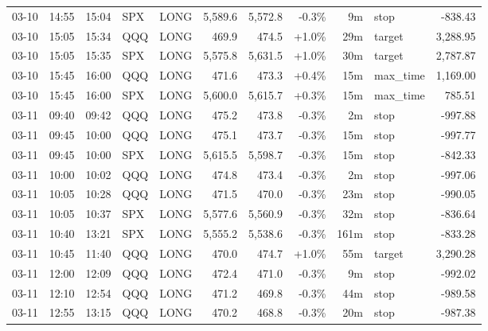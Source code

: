 \documentclass[11pt,a4paper,twoside]{article}
\begin{document}
\begin{center}
\begin{longtable}{>{\color{txtmain}}l l l l l r r r r >{\color{txtmain}}l r}
03-10 & 14:55 & 15:04 & SPX & LONG & 5,589.6 & 5,572.8 & \textcolor{lossred}{-0.3\%} & 9m & stop & \textcolor{lossred}{-838.43} \\
03-10 & 15:05 & 15:34 & QQQ & LONG & 469.9 & 474.5 & \textcolor{wingreen}{+1.0\%} & 29m & target & \textcolor{wingreen}{3,288.95} \\
03-10 & 15:05 & 15:35 & SPX & LONG & 5,575.8 & 5,631.5 & \textcolor{wingreen}{+1.0\%} & 30m & target & \textcolor{wingreen}{2,787.87} \\
03-10 & 15:45 & 16:00 & QQQ & LONG & 471.6 & 473.3 & \textcolor{wingreen}{+0.4\%} & 15m & max\_time & \textcolor{wingreen}{1,169.00} \\
03-10 & 15:45 & 16:00 & SPX & LONG & 5,600.0 & 5,615.7 & \textcolor{wingreen}{+0.3\%} & 15m & max\_time & \textcolor{wingreen}{785.51} \\
03-11 & 09:40 & 09:42 & QQQ & LONG & 475.2 & 473.8 & \textcolor{lossred}{-0.3\%} & 2m & stop & \textcolor{lossred}{-997.88} \\
03-11 & 09:45 & 10:00 & QQQ & LONG & 475.1 & 473.7 & \textcolor{lossred}{-0.3\%} & 15m & stop & \textcolor{lossred}{-997.77} \\
03-11 & 09:45 & 10:00 & SPX & LONG & 5,615.5 & 5,598.7 & \textcolor{lossred}{-0.3\%} & 15m & stop & \textcolor{lossred}{-842.33} \\
03-11 & 10:00 & 10:02 & QQQ & LONG & 474.8 & 473.4 & \textcolor{lossred}{-0.3\%} & 2m & stop & \textcolor{lossred}{-997.06} \\
03-11 & 10:05 & 10:28 & QQQ & LONG & 471.5 & 470.0 & \textcolor{lossred}{-0.3\%} & 23m & stop & \textcolor{lossred}{-990.05} \\
03-11 & 10:05 & 10:37 & SPX & LONG & 5,577.6 & 5,560.9 & \textcolor{lossred}{-0.3\%} & 32m & stop & \textcolor{lossred}{-836.64} \\
03-11 & 10:40 & 13:21 & SPX & LONG & 5,555.2 & 5,538.6 & \textcolor{lossred}{-0.3\%} & 161m & stop & \textcolor{lossred}{-833.28} \\
03-11 & 10:45 & 11:40 & QQQ & LONG & 470.0 & 474.7 & \textcolor{wingreen}{+1.0\%} & 55m & target & \textcolor{wingreen}{3,290.28} \\
03-11 & 12:00 & 12:09 & QQQ & LONG & 472.4 & 471.0 & \textcolor{lossred}{-0.3\%} & 9m & stop & \textcolor{lossred}{-992.02} \\
03-11 & 12:10 & 12:54 & QQQ & LONG & 471.2 & 469.8 & \textcolor{lossred}{-0.3\%} & 44m & stop & \textcolor{lossred}{-989.58} \\
03-11 & 12:55 & 13:15 & QQQ & LONG & 470.2 & 468.8 & \textcolor{lossred}{-0.3\%} & 20m & stop & \textcolor{lossred}{-987.38} \\

\end{longtable}
\end{center}
\end{document}
